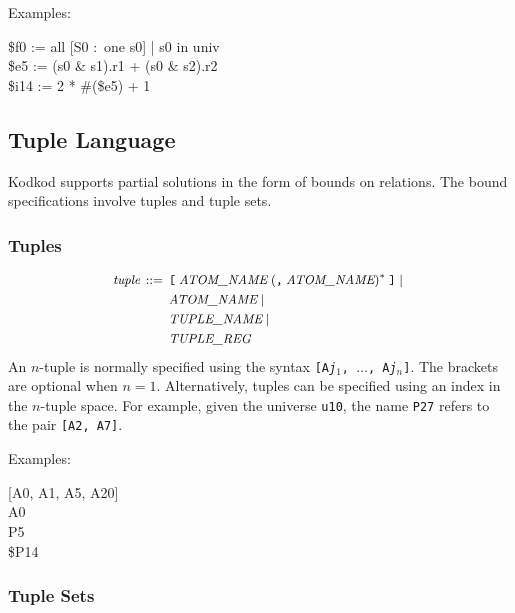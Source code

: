 \documentclass[a4paper,12pt]{article}
\begin{document}
    Examples:

    \pre
    \ttfamily\small
    \$f0 := all [S0 :~one s0] | s0 in univ \\
    \$e5 := (s0 \& s1).r1 + (s0 \& s2).r2 \\
    \$i14 := 2 * \#(\$e5) + 1
    \post

    \subsection{Tuple Language}
    \label{tuple-language}

    Kodkod supports partial solutions in the form of bounds on relations. The bound
    specifications involve tuples and tuple sets.

    \subsubsection{Tuples}
    \label{tuples}

    $$\small\begin{aligned}
                \textit{tuple} \,::=\,{}
                & \verb|[|\; \textit{ATOM\_NAME}\; (\verb|,|\; \textit{ATOM\_NAME})^*\; \verb|]| \mid {} \\
                & \textit{ATOM\_NAME} \mid {} \\
                & \textit{TUPLE\_NAME} \mid {} \\
                & \textit{TUPLE\_REG}
    \end{aligned}$$
%
    An $n$-tuple is normally specified using the syntax \texttt{[A\textit{j}$_1$,
        $\ldots$, A\textit{j}$_n$]}. The brackets are optional when $n = 1$.
    Alternatively, tuples can be specified using an index in the $n$-tuple space.
    For example, given the universe \verb|u10|, the name \verb|P27| refers to the
    pair \verb|[A2, A7]|.

    Examples:

    \pre
    \ttfamily\small
    [A0, A1, A5, A20] \\
    A0 \\
    P5 \\
    \$P14
    \post

    \subsubsection{Tuple Sets}
    \label{tuple-sets}
\end{document}
